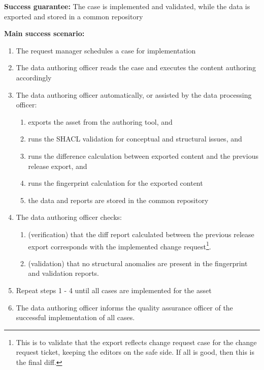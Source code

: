 	\textbf{Success guarantee:} The case is implemented and validated, while the data is exported and stored in a common repository
	
	\textbf{Main success scenario:}
	
	\begin{enumerate}
		\item The request manager schedules a case for implementation
		\item The data authoring officer reads the case and executes the content authoring accordingly
		\item The data authoring officer automatically, or assisted by the data processing officer:
		\begin{enumerate}
			\item exports the asset from the authoring tool, and 
			\item runs the SHACL validation for conceptual and structural issues, and
			\item runs the difference calculation between exported content and the previous release export, and
			\item runs the fingerprint calculation for the exported content
			\item the data and reports are stored in the common repository 
		\end{enumerate}		
		\item The data authoring officer checks: 
		\begin{enumerate}
			\item (verification) that the diff report calculated between the previous release export corresponds with the implemented change request\footnote{This is to validate that the export reflects change request case for the change request ticket, keeping the editors on the safe side. If all is good, then this is the final diff.}.
			\item (validation) that no structural anomalies are present in the fingerprint and validation reports.
		\end{enumerate}		 
		\item Repeat steps 1 - 4 until all cases are implemented for the asset
		\item The data authoring officer informs the quality assurance officer of the successful implementation of all cases.		
	\end{enumerate}
	
